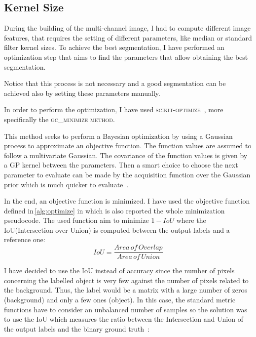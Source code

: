 \documentclass{standalone}
\begin{document}
	\subsection{Kernel Size}


	During the building of the multi-channel image, I had to compute different image features, that requires the setting of different parameters, like median or standard filter kernel sizes. To achieve the best segmentation, I have performed an optimization step that aims to find the parameters that allow obtaining the best segmentation. 

	Notice that this process is not necessary and a good segmentation can be achieved also by setting these parameters manually.

	In order to perform the optimization, I have used \textsc{scikit-optimize}~\cite{skopt}, more specifically the \textsc{gc\_minimize method}.

	This method seeks to perform a Bayesian optimization by using a Gaussian process to approximate an objective function. The function values are assumed to follow a multivariate Gaussian. The covariance of the function values is given by a GP kernel between the parameters. Then a smart choice to choose the next parameter to evaluate can be made by the acquisition function over the Gaussian prior which is much quicker to evaluate~\cite{skopt}.

	In the end, an objective function is minimized. I have used the objective function defined in\,\ref{alg:optimize} in which is also reported the whole minimization pseudocode. The used function aim to minimize $1 - IoU$ where the IoU(Intersection over Union) is computed between the output labels and a reference one:
	\begin{equation*}
			IoU = \frac{Area\,of\,Overlap}{Area\,of\,Union}
			\label{eq:IoU}
	\end{equation*}
		
	
	I have decided to use the IoU instead of accuracy since the number of pixels concerning the labelled object is very few against the number of pixels related to the background. Thus, the label would be a matrix with a large number of zeros (background) and only a few ones (object). In this case, the standard metric functions have to consider an unbalanced number of samples so the solution was to use the IoU which measures the ratio between the Intersection and Union of the output labels and the binary ground truth~\cite{PhDtheis}:
\end{document}
